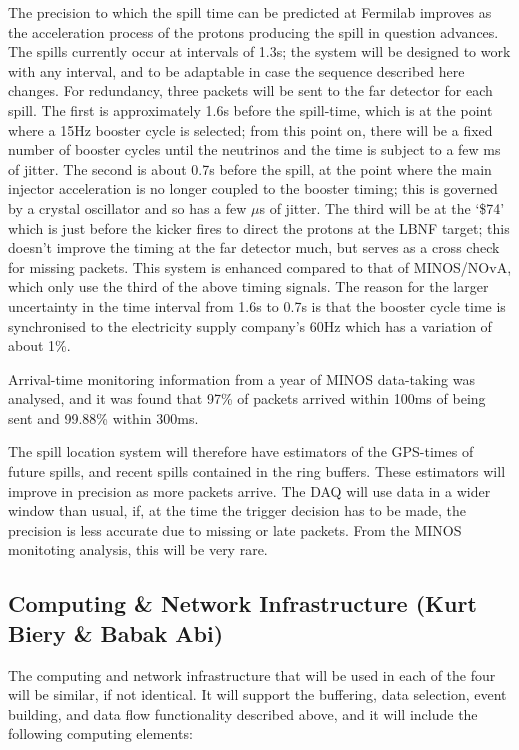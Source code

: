 The precision to which the spill time can be predicted at Fermilab
improves as the acceleration process of the protons producing the
spill in question advances.  The spills currently occur at intervals
of 1.3\/s; the system will be designed to work with any interval, and
to be adaptable in case the sequence described here changes.  For
redundancy, three packets will be sent to the far detector for each
spill.  The first is approximately 1.6\/s before the spill-time, which
is at the point where a 15\/Hz booster cycle is selected; from this
point on, there will be a fixed number of booster cycles until the
neutrinos and the time is subject to a few ms of jitter.  The second
is about 0.7\/s before the spill, at the point where the main injector
acceleration is no longer coupled to the booster timing; this is
governed by a crystal oscillator and so has a few $\mu$s of jitter.
The third will be at the `\$74' which is just before the kicker fires
to direct the protons at the LBNF target; this doesn't improve the
timing at the far detector much, but serves as a cross check for
missing packets.  This system is enhanced compared to that of
MINOS/NOvA, which only use the third of the above timing signals.  The
reason for the larger uncertainty in the time interval from 1.6\/s to
0.7\/s is that the booster cycle time is synchronised to the
electricity supply company's 60\/Hz which has a variation of about
1\%.

Arrival-time monitoring information from a year of MINOS data-taking
was analysed, and it was found that 97\% of packets arrived within
100\/ms of being sent and 99.88\% within 300\/ms.

The spill location system will therefore have estimators of the
GPS-times of future spills, and recent spills contained in the ring
buffers. These estimators will improve in precision as more packets
arrive.  The DAQ will use data in a wider window than usual, if, at
the time the trigger decision has to be made, the precision is less
accurate due to missing or late packets.  From the MINOS monitoting
analysis, this will be very rare.

\subsection{Computing \& Network Infrastructure (Kurt Biery \& Babak Abi)}
\label{sec:fdsp-daq-infra}

The computing and network infrastructure that will be used in each
of the four  will be similar, if not identical.
It will support the buffering, data selection, event
building, and data flow functionality described
above, and it will include the following computing elements:

